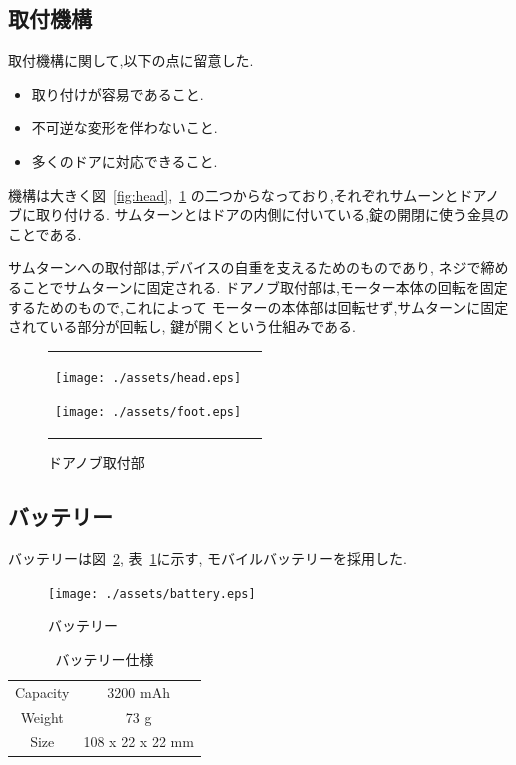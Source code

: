 \subsection{取付機構}
取付機構に関して,以下の点に留意した.

\begin{itemize}[noitemsep]
  \item 取り付けが容易であること.
  \item 不可逆な変形を伴わないこと.
  \item 多くのドアに対応できること.
\end{itemize}

機構は大きく図~\ref{fig:head},~\ref{fig:foot}
の二つからなっており,それぞれサムーンとドアノブに取り付ける.
サムターンとはドアの内側に付いている,錠の開閉に使う金具のことである.

サムターンへの取付部は,デバイスの自重を支えるためのものであり,
ネジで締めることでサムターンに固定される.
ドアノブ取付部は,モーター本体の回転を固定するためのもので,これによって
モーターの本体部は回転せず,サムターンに固定されている部分が回転し,
鍵が開くという仕組みである.

\begin{figure}[htbp]
  \begin{tabular}{cc}
    \begin{minipage}{0.5\hsize}
      \begin{center}
        \texttt{[image: ./assets/head.eps]}
        \caption{サムターン取付部}
        \label{fig:head}
      \end{center}
    \end{minipage}
    \begin{minipage}{0.5\hsize}
      \begin{center}
        \texttt{[image: ./assets/foot.eps]}
        \caption{ドアノブ取付部}
        \label{fig:foot}
      \end{center}
    \end{minipage}
  \end{tabular}
\end{figure}

\subsection{バッテリー}
バッテリーは図~\ref{fig:battery}, 表~\ref{tbl:battery}に示す,
モバイルバッテリーを採用した.

\begin{figure}[htbp]
  \centering
  \texttt{[image: ./assets/battery.eps]}
  \caption{バッテリー}
  \label{fig:battery}
\end{figure}

\begin{table}[htbp]
  \begin{center}
    \begin{tabular}{cc}
      Capacity & 3200 mAh \\
      Weight & 73 g \\
      Size & 108 x 22 x 22 mm \\
    \end{tabular}
    \caption{バッテリー仕様}
    \label{tbl:battery}
  \end{center}
\end{table}

